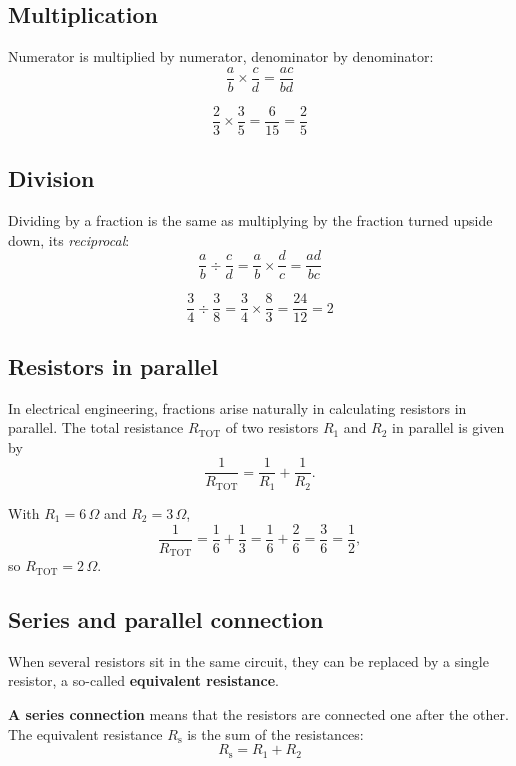 \subsection{Multiplication}
\label{c1:sec:brmult}
Numerator is multiplied by numerator, denominator by denominator:
\[
  \frac{a}{b} \times \frac{c}{d} = \frac{ac}{bd}
\]

\begin{exempel}
\[
  \frac{2}{3} \times \frac{3}{5} = \frac{6}{15} = \frac{2}{5}
\]
\end{exempel}

\subsection{Division}
\label{c1:sec:brdiv}
Dividing by a fraction is the same as multiplying by the fraction turned upside down, its
\emph{reciprocal}:
\[
  \frac{a}{b} \div \frac{c}{d} = \frac{a}{b} \times \frac{d}{c} = \frac{ad}{bc}
\]

\begin{exempel}
\[
  \frac{3}{4} \div \frac{3}{8} = \frac{3}{4} \times \frac{8}{3} = \frac{24}{12} = 2
\]
\end{exempel}

\subsection{Resistors in parallel}
\label{c1:sec:parallell}
In electrical engineering, fractions arise naturally in calculating resistors in parallel. The
total resistance $R_{\text{TOT}}$ of two resistors $R_1$ and $R_2$ in parallel is given by
\[
  \frac{1}{R_{\text{TOT}}} = \frac{1}{R_1} + \frac{1}{R_2}.
\]

\begin{exempel}
With $R_1 = 6\,\Omega$ and $R_2 = 3\,\Omega$,
\[
  \frac{1}{R_{\text{TOT}}} = \frac{1}{6} + \frac{1}{3} = \frac{1}{6} + \frac{2}{6} = \frac{3}{6}
  = \frac{1}{2},
\]
so $R_{\text{TOT}} = 2\,\Omega$.
\end{exempel}

\subsection{Series and parallel connection}
\label{c1:sec:serieparallell}
When several resistors sit in the same circuit, they can be replaced by a single resistor, a
so-called \textbf{equivalent resistance}.

\textbf{A series connection} means that the resistors are connected one after the other. The
equivalent resistance $R_{\text{s}}$ is the sum of the resistances:
\[
  R_{\text{s}} = R_1 + R_2
\]

